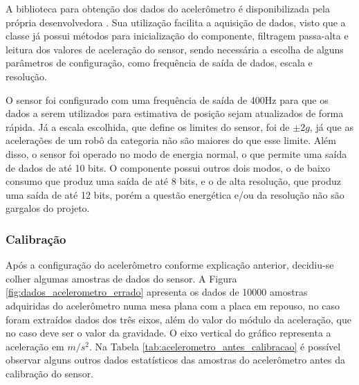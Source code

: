 \documentclass[acronym, symbols, table, deposito]{fei}
\begin{document}
	A biblioteca para obtenção dos dados do acelerômetro é disponibilizada pela própria desenvolvedora \cite{accelero_repository}. Sua utilização facilita a aquisição de dados, visto que a classe já possui métodos para inicialização do componente, filtragem passa-alta e leitura dos valores de aceleração do sensor, sendo necessária a escolha de alguns parâmetros de configuração, como frequência de saída de dados, escala e resolução.
	
	O sensor foi configurado com uma frequência de saída de 400Hz para que os dados a serem utilizados para estimativa de posição sejam atualizados de forma rápida. Já a escala escolhida, que define os limites do sensor, foi de $\pm2g$, já que as acelerações de um robô da categoria  não são maiores do que esse limite. Além disso, o sensor foi operado no modo de energia normal, o que permite uma saída de dados de até 10 bits. O componente possui outros dois modos, o de baixo consumo que produz uma saída de até 8 bits, e o de alta resolução, que produz uma saída de até 12 bits, porém a questão energética e/ou da resolução não são gargalos do projeto.
	
	\subsubsection{Calibração}
	
	Após a configuração do acelerômetro conforme explicação anterior, decidiu-se colher algumas amostras de dados do sensor. A Figura \ref{fig:dados_acelerometro_errado} apresenta os dados de 10000 amostras adquiridas do acelerômetro numa mesa plana com a placa em repouso, no caso foram extraídos dados dos três eixos, além do valor do módulo da aceleração, que no caso deve ser o valor da gravidade. O eixo vertical do gráfico representa a aceleração em $m/s^2$. Na Tabela \ref{tab:acelerometro_antes_calibracao} é possível observar alguns outros dados estatísticos das amostras do acelerômetro antes da calibração do sensor.
	
\end{document}

